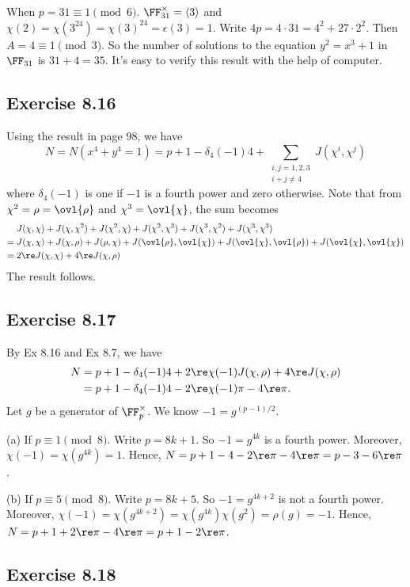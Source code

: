 \documentclass[../Chapter.tex]{subfiles}
\begin{document}
When $p=31\equiv1\pmod{6}$. $\FF_{31}^\times=\langle3\rangle$ and $\chi(2)=\chi(3^{24})=\chi(3)^{24}=\epsilon(3)=1$. Write $4p=4\cdot31=4^2+27\cdot2^2$. Then $A=4\equiv1\pmod{3}$. So the number of solutions to the equation $y^2=x^3+1$ in $\FF_{31}$ is $31+4=35$. It's easy to verify this result with the help of computer.

\subsection*{Exercise 8.16}

Using the result in page 98, we have $$N=N(x^4+y^4=1)=p+1-\delta_4(-1)4+\sum_{\substack{i,j=1,2,3\\ i+j\neq4}} J(\chi^i,\chi^j)$$ where $\delta_4(-1)$ is one if $-1$ is a fourth power and zero otherwise. Note that from $\chi^2=\rho=\ovl{\rho}$ and $\chi^3=\ovl{\chi}$, the sum becomes 
\begin{align*}
&J(\chi,\chi)+J(\chi,\chi^2)+J(\chi^2,\chi)+J(\chi^2,\chi^3)+J(\chi^3,\chi^2)+J(\chi^3,\chi^3) \\
={} &J(\chi,\chi)+J(\chi,\rho)+J(\rho,\chi)+J(\ovl{\rho},\ovl{\chi})+J(\ovl{\chi},\ovl{\rho})+J(\ovl{\chi},\ovl{\chi}) \\
={} &2\re J(\chi,\chi)+4\re J(\chi,\rho)
\end{align*}
The result follows.

\subsection*{Exercise 8.17}

By Ex 8.16 and Ex 8.7, we have
\begin{align*}
N &= p+1-\delta_4(-1)4+2\re\chi(-1)J(\chi,\rho)+4\re J(\chi,\rho) \\
&= p+1-\delta_4(-1)4-2\re\chi(-1)\pi-4\re\pi.
\end{align*}
Let $g$ be a generator of $\FF_p^\times$. We know $-1=g^{(p-1)/2}$.

(a) If $p\equiv1\pmod{8}$. Write $p=8k+1$. So $-1=g^{4k}$ is a fourth power. Moreover, $\chi(-1)=\chi(g^{4k})=1$. Hence, $N=p+1-4-2\re\pi-4\re\pi=p-3-6\re\pi$.

(b) If $p\equiv5\pmod{8}$. Write $p=8k+5$. So $-1=g^{4k+2}$ is not a fourth power. Moreover, $\chi(-1)=\chi(g^{4k+2})=\chi(g^{4k})\chi(g^2)=\rho(g)=-1$. Hence, $N=p+1+2\re\pi-4\re\pi=p+1-2\re\pi$.

\subsection*{Exercise 8.18}
\end{document}
